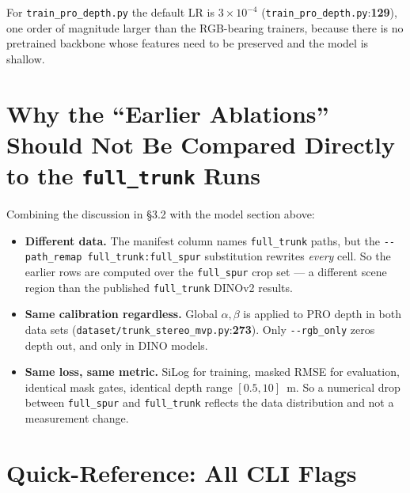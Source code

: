 \documentclass[11pt]{article}
\newcommand{\fref}[2]{\texttt{\textcolor{filegray}{#1}}:\textbf{#2}}
\begin{document}
For \texttt{train\_pro\_depth.py} the default LR is $3\times10^{-4}$
(\fref{train\_pro\_depth.py}{129}), one order of magnitude larger than
the RGB-bearing trainers, because there is no pretrained backbone whose
features need to be preserved and the model is shallow.

\section{Why the ``Earlier Ablations'' Should Not Be Compared Directly
to the \texttt{full\_trunk} Runs}

Combining the discussion in \S3.2 with the model section above:
\begin{itemize}[leftmargin=2em]
  \item \textbf{Different data.} The manifest column names
        \texttt{full\_trunk} paths, but the
        \texttt{-{}-path\_remap full\_trunk:full\_spur} substitution
        rewrites \emph{every} cell. So the earlier rows are computed
        over the \texttt{full\_spur} crop set --- a different scene
        region than the published \texttt{full\_trunk} DINOv2 results.
  \item \textbf{Same calibration regardless.} Global $\alpha,\beta$ is
        applied to PRO depth in both data sets
        (\fref{dataset/trunk\_stereo\_mvp.py}{273}). Only
        \texttt{-{}-rgb\_only} zeros depth out, and only in DINO models.
  \item \textbf{Same loss, same metric.} SiLog for training, masked
        RMSE for evaluation, identical mask gates, identical depth
        range $[0.5, 10]$~m. So a numerical drop between
        \texttt{full\_spur} and \texttt{full\_trunk} reflects the
        data distribution and not a measurement change.
\end{itemize}

\section{Quick-Reference: All CLI Flags}
\end{document}
